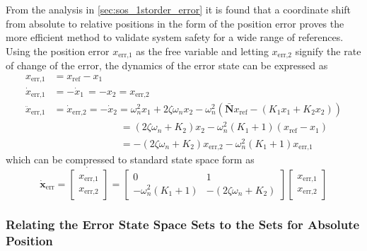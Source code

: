 From the analysis in \autoref{sec:sos_1storder_error} it is found that a coordinate shift from absolute to relative positions in the form of the position error proves the more efficient method to validate system safety for a wide range of references. Using the position error $x_\text{err,1}$ as the free variable and letting $x_\text{err,2}$ signify the rate of change of the error, the dynamics of the error state can be expressed as
\begin{align*}
x_\text{err,1}&=x_\text{ref}-x_1\\
\dot{x}_\text{err,1} &= -\dot{x}_1 \,=-x_2=x_\text{err,2}\\
\ddot{x}_\text{err,1} &= \dot{x}_\text{err,2} = -\dot{x}_2 = \omega_n^2 x_1 +2\zeta\omega_n x_2 - \omega_n^2(\bar{\mathbf{N}}x_\text{ref}-(K_1x_1+K_2 x_2))\nonumber\\
& \phantom{= -\ddot{x}_\text{err,1} = \dot{x}_2. } = (2\zeta\omega_n +K_2)x_2 -\omega_n^2(K_1+1)(x_\text{ref}-x_1)\nonumber\\
& \phantom{= -\ddot{x}_\text{err,1} = \dot{x}_2. } = -(2\zeta\omega_n +K_2){x}_\text{err,2} - \omega_n^2(K_1+1)x_\text{err,1}
\end{align*}
which can be compressed to standard state space form as
\begin{equation}
\dot{\mathbf{x}}_\text{err}= 
\dot{\begin{bmatrix}
{x}_\text{err,1} \\ 
{x}_\text{err,2}
\end{bmatrix}} =
\begin{bmatrix}
0 & 1 \\
-\omega_n^2(K_1+1) & -(2\zeta\omega_n +K_2)
\end{bmatrix}
\begin{bmatrix}
x_\text{err,1} \\ {x}_\text{err,2}
\end{bmatrix}
\label{eq:sos_2ndorder_error}
\end{equation}

\subsubsection{Relating the Error State Space Sets to the Sets for Absolute Position}

